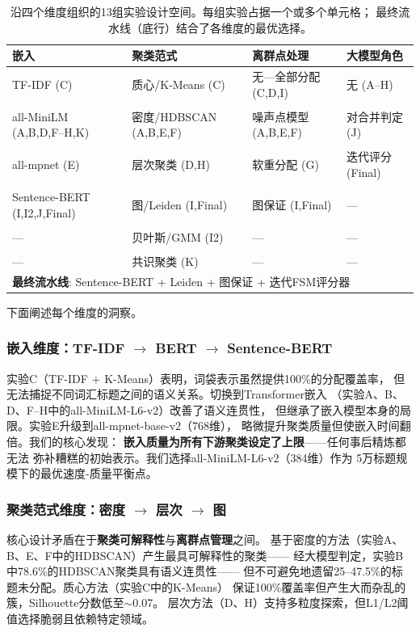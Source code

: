 \documentclass[10pt,twocolumn,twoside]{ctexart}
\begin{document}
\begin{table}[h]
\centering
\caption{沿四个维度组织的13组实验设计空间。每组实验占据一个或多个单元格；
最终流水线（底行）结合了各维度的最优选择。}
\label{tab:design_space}
\small
\renewcommand{\arraystretch}{1.1}
\begin{tabular}{p{2.2cm}p{2.0cm}p{1.8cm}p{1.4cm}}
\toprule
\textbf{嵌入} & \textbf{聚类范式} & \textbf{离群点处理} & \textbf{大模型角色} \\
\midrule
TF-IDF (C) 
& 质心/K-Means (C)
& 无---全部分配 (C,D,I)
& 无 (A--H) \\
& & & \\
all-MiniLM (A,B,D,F--H,K)
& 密度/HDBSCAN (A,B,E,F)
& 噪声点模型 (A,B,E,F)
& 对合并判定 (J) \\
& & & \\
all-mpnet (E)
& 层次聚类 (D,H)
& 软重分配 (G)
& 迭代评分 (Final) \\
& & & \\
Sentence-BERT (I,I2,J,Final)
& 图/Leiden (I,Final)
& 图保证 (I,Final)
& --- \\
& & & \\
--- 
& 贝叶斯/GMM (I2)
& ---
& --- \\
& & & \\
--- 
& 共识聚类 (K)
& ---
& --- \\
\bottomrule
\midrule
\multicolumn{4}{l}{\textbf{最终流水线}: Sentence-BERT + Leiden + 图保证 + 迭代FSM评分器} \\
\bottomrule
\end{tabular}
\end{table}

下面阐述每个维度的洞察。

\subsubsection{嵌入维度：TF-IDF $\rightarrow$ BERT $\rightarrow$ Sentence-BERT}
实验C（TF-IDF + K-Means）表明，词袋表示虽然提供100\%的分配覆盖率，
但无法捕捉不同词汇标题之间的语义关系。切换到Transformer嵌入
（实验A、B、D、F--H中的all-MiniLM-L6-v2）改善了语义连贯性，
但继承了嵌入模型本身的局限。实验E升级到all-mpnet-base-v2（768维），
略微提升聚类质量但使嵌入时间翻倍。我们的核心发现：
\textbf{嵌入质量为所有下游聚类设定了上限}——任何事后精炼都无法
弥补糟糕的初始表示。我们选择all-MiniLM-L6-v2（384维）作为
5万标题规模下的最优速度-质量平衡点。

\subsubsection{聚类范式维度：密度 $\rightarrow$ 层次 $\rightarrow$ 图}
核心设计矛盾在于\textbf{聚类可解释性}与\textbf{离群点管理}之间。
基于密度的方法（实验A、B、E、F中的HDBSCAN）产生最具可解释性的聚类——
经大模型判定，实验B中78.6\%的HDBSCAN聚类具有语义连贯性——
但不可避免地遗留25--47.5\%的标题未分配。质心方法（实验C中的K-Means）
保证100\%覆盖率但产生大而杂乱的簇，Silhouette分数低至$\sim$0.07。
层次方法（D、H）支持多粒度探索，但L1/L2阈值选择脆弱且依赖特定领域。
\end{document}
